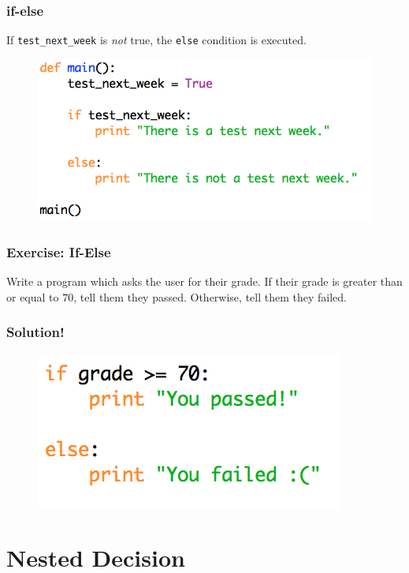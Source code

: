 \documentclass{beamer}
\begin{document}
\begin{frame}[fragile]
\frametitle{if-else}

If \verb|test_next_week| is \emph{not} true, the \verb|else| condition is executed.

\begin{figure}
\centering
\includegraphics[scale=0.8]{IMG/5.png}
\end{figure}
\end{frame}

\begin{frame}
\frametitle{Exercise: If-Else}

Write a program which asks the user for their grade. If their grade is greater than or equal to $70$, tell them they passed. Otherwise, tell them they failed.
\end{frame}

\begin{frame}
\frametitle{Solution!}

\begin{figure}
\centering
\includegraphics[scale=0.8]{IMG/ifelse_grades.png}
\end{figure}
\end{frame}








\section{Nested Decision}
\end{document}
